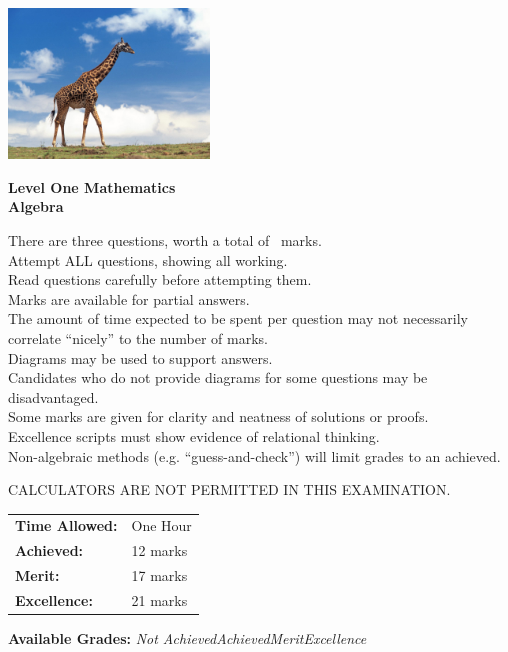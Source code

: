 \documentclass[a4paper,addpoints]{exam}
\begin{document}
\begin{coverpages}

\begin{center}
  \includegraphics[width=0.4\textwidth]{giraffe}

  \vspace{5mm}

  \textbf{\Huge{Level One Mathematics\\Algebra}}
\end{center}

\vspace{5mm}

\noindent
\large{There are three questions, worth a total of \numpoints\ marks.\\
       Attempt ALL questions, showing all working.\\
       Read questions carefully before attempting them.\\
       Marks are available for partial answers.\\
       The amount of time expected to be spent per question may not necessarily correlate ``nicely'' to the number of marks.\\
       Diagrams may be used to support answers.\\
       Candidates who do not provide diagrams for some questions may be disadvantaged.\\
       Some marks are given for clarity and neatness of solutions or proofs.\\
       Excellence scripts must show evidence of relational thinking.\\
       Non-algebraic methods (e.g. ``guess-and-check'') will limit grades to an achieved.
       \vspace{2mm}

       \noindent CALCULATORS ARE NOT PERMITTED IN THIS EXAMINATION.}
\vspace{3mm}

\begin{tabular}{ll}
  \textbf{Time Allowed:}& One Hour\\
  \textbf{Achieved:}& 12 marks\\
  \textbf{Merit:}& 17 marks\\
  \textbf{Excellence:}& 21 marks
\end{tabular}

\vfill

\begin{center}
  \gradetable[h][questions]
  \vspace{2mm}

  \textbf{Available Grades:} \textit{Not Achieved}\quad\textit{Achieved}\quad\textit{Merit}\quad\textit{Excellence}
\end{center}

\end{coverpages}
\end{document}
